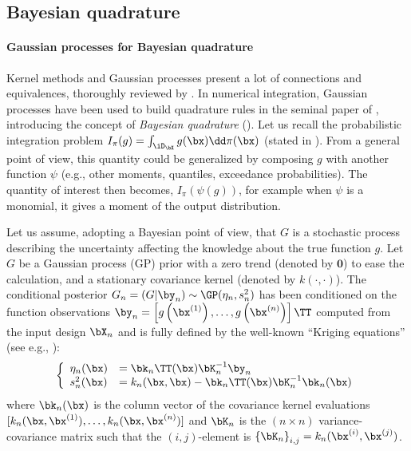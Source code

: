 
\subsection{Bayesian quadrature}
\paragraph{Gaussian processes for Bayesian quadrature}%

Kernel methods and Gaussian processes present a lot of connections and equivalences, thoroughly reviewed by \cite{motonobu_2018}. 
In numerical integration, Gaussian processes have been used to build quadrature rules in the seminal paper of \cite{ohagan_1991}, introducing the concept of \emph{Bayesian quadrature} (). 
Let us recall the probabilistic integration problem $I_\pi(g) = \int_{\iD_\bX} g(\bx) \dd \pi(\bx)$ (stated in ). 
From a general point of view, this quantity could be generalized by composing $g$ with another function $\psi$ (e.g., other moments, quantiles, exceedance probabilities). 
The quantity of interest then becomes, $I_\pi(\psi(g))$, for example when $\psi$ is a monomial, it gives a moment of the output distribution.

Let us assume, adopting a Bayesian point of view, that $G$ is a stochastic process describing the uncertainty affecting the knowledge about the true function $g$. 
Let $G$ be a Gaussian process (GP) prior with a zero trend (denoted by $\textbf{0}$) to ease the calculation, and a stationary covariance kernel (denoted by $k(\cdot, \cdot)$). 
The conditional posterior $G_n = (G | \by_n) \sim \GP(\eta_n, s_n^2)$ has been conditioned on the function observations $\by_n = \left[g\left(\bx^{(1)}\right), \ldots, g\left(\bx^{(n)}\right)\right]\TT$ computed from the input design $\bX_n$ and is fully defined by the well-known ``Kriging equations'' (see e.g., \citealp{rasmussen_2006}):
\begin{equation}
    \left\{
    \begin{array}{ll}
        \eta_n(\bx) &= \bk_n\TT(\bx) \bK_n^{-1} \by_n\\
        s_n^2(\bx) &= k_n(\bx, \bx) - \bk_n\TT(\bx) \bK_n^{-1} \bk_n(\bx)
    \end{array}
\right.
\label{eq:kriging}
\end{equation}
where $\bk_n(\bx)$ is the column vector of the covariance kernel evaluations $[k_n(\bx, \bx^{(1)}), \dots,\allowbreak k_n(\bx, \bx^{(n)})]$ and $\bK_n$ is the $(n \times n)$ variance-covariance matrix such that the $(i, j)$-element is $\left\{\bK_n \right\}_{i, j}=k_n(\bx^{(i)}, \bx^{(j)})$.

